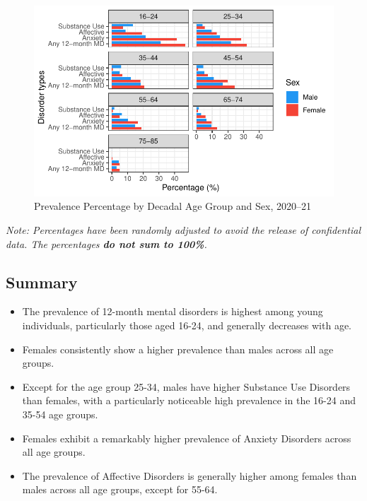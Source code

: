 \documentclass[
  a4paper,
  DIV=11,
  numbers=noendperiod]{scrreport}
\begin{document}
\begin{figure}

\caption{\label{fig-12dgp}Prevalence Percentage by Decadal Age Group and
Sex, 2020--21}

{\centering \includegraphics{./chap1-prevalence-of-md_files/figure-pdf/fig-12dgp-1.pdf}

}

\end{figure}

\emph{Note: Percentages have been randomly adjusted to avoid the release
of confidential data. The percentages \textbf{do not sum to 100\%}.}

\hypertarget{summary-2}{%
\subsection{Summary}\label{summary-2}}

\begin{itemize}
\item
  The prevalence of 12-month mental disorders is highest among young
  individuals, particularly those aged 16-24, and generally decreases
  with age.
\item
  Females consistently show a higher prevalence than males across all
  age groups.
\item
  Except for the age group 25-34, males have higher Substance Use
  Disorders than females, with a particularly noticeable high prevalence
  in the 16-24 and 35-54 age groups.
\item
  Females exhibit a remarkably higher prevalence of Anxiety Disorders
  across all age groups.
\item
  The prevalence of Affective Disorders is generally higher among
  females than males across all age groups, except for 55-64.
\end{itemize}
\end{document}
